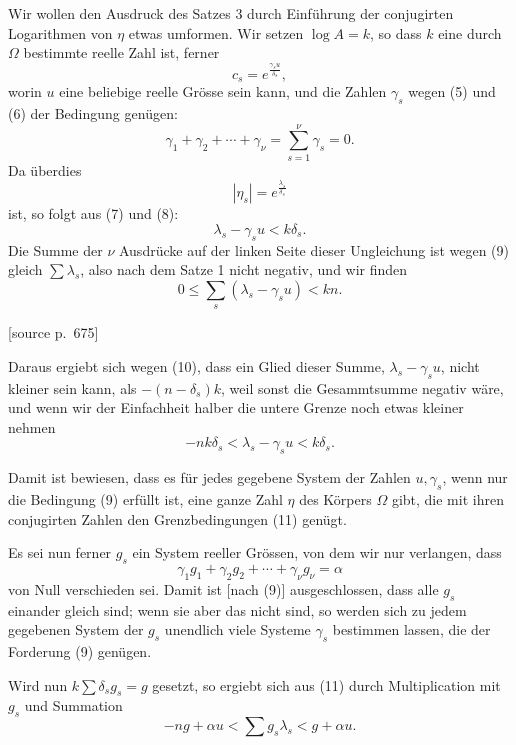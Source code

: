 \documentclass[11pt]{article}
\newcommand{\srcpage}[1]{\par\medskip\noindent\textsf{[source p.~#1]}\par\smallskip}
\begin{document}
Wir wollen den Ausdruck des Satzes 3 durch Einführung der conjugirten Logarithmen von $\eta$ etwas umformen. Wir setzen $\log A=k$, so dass $k$ eine durch $\Omega$ bestimmte reelle Zahl ist, ferner
\begin{equation}
c_s=e^{\frac{\gamma_su}{\delta_s}},
\tag{8}
\end{equation}
worin $u$ eine beliebige reelle Grösse sein kann, und die Zahlen $\gamma_s$ wegen (5) und (6) der Bedingung genügen:
\begin{equation}
\gamma_1+\gamma_2+\cdots+\gamma_\nu=\sum_{s=1}^{\nu}\gamma_s=0.
\tag{9}
\end{equation}
Da überdies
\[
|\eta_s|=e^{\frac{\lambda_s}{\delta_s}}
\]
ist, so folgt aus (7) und (8):
\begin{equation}
\lambda_s-\gamma_su<k\delta_s.
\tag{10}
\end{equation}
Die Summe der $\nu$ Ausdrücke auf der linken Seite dieser Ungleichung ist wegen (9) gleich $\sum\lambda_s$, also nach dem Satze 1 nicht negativ, und wir finden
\[
0\leq \sum_s(\lambda_s-\gamma_su)<kn.
\]

\srcpage{675}
Daraus ergiebt sich wegen (10), dass ein Glied dieser Summe, $\lambda_s-\gamma_su$, nicht kleiner sein kann, als $-(n-\delta_s)k$, weil sonst die Gesammtsumme negativ wäre, und wenn wir der Einfachheit halber die untere Grenze noch etwas kleiner nehmen
\begin{equation}
-nk\delta_s<\lambda_s-\gamma_su<k\delta_s.
\tag{11}
\end{equation}

Damit ist bewiesen, dass es für jedes gegebene System der Zahlen $u,\gamma_s$, wenn nur die Bedingung (9) erfüllt ist, eine ganze Zahl $\eta$ des Körpers $\Omega$ gibt, die mit ihren conjugirten Zahlen den Grenzbedingungen (11) genügt.

Es sei nun ferner $g_s$ ein System reeller Grössen, von dem wir nur verlangen, dass
\[
\gamma_1g_1+\gamma_2g_2+\cdots+\gamma_\nu g_\nu=\alpha
\]
von Null verschieden sei. Damit ist [nach (9)] ausgeschlossen, dass alle $g_s$ einander gleich sind; wenn sie aber das nicht sind, so werden sich zu jedem gegebenen System der $g_s$ unendlich viele Systeme $\gamma_s$ bestimmen lassen, die der Forderung (9) genügen.

Wird nun $k\sum\delta_sg_s=g$ gesetzt, so ergiebt sich aus (11) durch Multiplication mit $g_s$ und Summation
\begin{equation}
-ng+\alpha u<\sum g_s\lambda_s<g+\alpha u.
\tag{12}
\end{equation}
\end{document}

